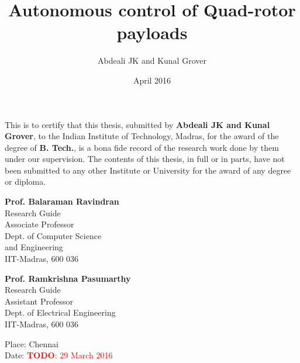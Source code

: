 \documentclass[BTech]{iitmdiss}
\newcommand\todo[1]{\textcolor{red}{{\bf TODO}: #1}}
\begin{document}

\title{Autonomous control of Quad-rotor payloads}

\author{Abdeali JK and Kunal Grover}

\date{April 2016}

\maketitle

\certificate

\vspace*{0.5in}

\noindent This is to certify that this thesis, submitted by {\bf Abdeali JK and Kunal Grover}, to the Indian Institute of Technology, Madras, for the award of the degree of {\bf B. Tech.}, is a bona fide record of the research work done by them under our supervision. The contents of this thesis, in full or in parts, have not been submitted to any other Institute or University for the award of any degree or diploma.

\vspace*{1.5in}

\begin{singlespacing}

\begin{minipage}[t]{0.45\textwidth}
  {\bf Prof. Balaraman Ravindran} \\
  Research Guide \\
  Associate Professor \\
  Dept. of Computer Science \\
  and Engineering \\
  IIT-Madras, 600 036
\end{minipage}
\hfill
\begin{minipage}[t]{0.45\textwidth}
  {\bf Prof. Ramkrishna Pasumarthy} \\
  Research Guide \\
  Assistant Professor \\
  Dept. of Electrical Engineering \\
  IIT-Madras, 600 036
\end{minipage}

\end{singlespacing}

\vspace*{0.25in}
\noindent Place: Chennai\\
Date: \todo{29 March 2016}
\end{document}
